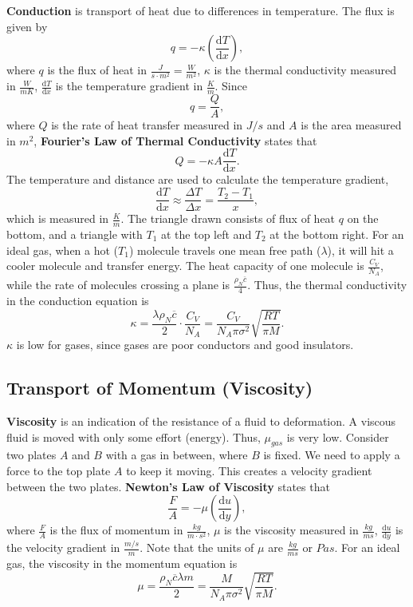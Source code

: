 \documentclass[11pt]{article}
\theoremstyle{plain} %
\theoremstyle{definition}
\theoremstyle{example}
\theoremstyle{remark}
\begin{document}
\textbf{Conduction} is transport of heat due to differences in temperature. The flux is given by $$q = -\kappa\left(\frac{\mathrm d T}{\mathrm d x}\right),$$
where $q$ is the flux of heat in $\frac{J}{s\cdot m^2} = \frac{W}{m^2}$, $\kappa$ is the thermal conductivity measured in $\frac{W}{mK}$, $\frac{\mathrm d T}{\mathrm d x}$ is the temperature gradient in $\frac{K}{m}$. Since $$q = \frac{Q}{A},$$ where $Q$ is the rate of heat transfer measured in $J/s$ and $A$ is the area measured in $m^2$, \textbf{Fourier's Law of Thermal Conductivity} states that 
$$Q = -\kappa A\frac{\mathrm d T}{\mathrm d x}.$$ The temperature and distance are used to calculate the temperature gradient,
$$\frac{\mathrm d T}{\mathrm d x} \approx \frac{\Delta T}{\Delta x} = \frac{T_2-T_1}{x},$$ which is measured in $\frac{K}{m}$. The triangle drawn consists of flux of heat $q$ on the bottom, and a triangle with $T_1$ at the top left and $T_2$ at the bottom right. For an ideal gas, when a hot ($T_1$) molecule travels one mean free path ($\lambda$), it will hit a cooler molecule and transfer energy. The heat capacity of one molecule is $\frac{C_V}{N_A}$, while the rate of molecules crossing a plane is $\frac{\rho_N\overline{c}}{4}$. Thus, the thermal conductivity in the conduction equation is 
$$\kappa = \frac{\lambda\rho_N\overline{c}}{2}\cdot \frac{C_V}{N_A} = \frac{C_V}{N_A\pi\sigma^2}\sqrt{\frac{RT}{\pi M}}.$$
$\kappa$ is low for gases, since gases are poor conductors and good insulators. 
	
	
\subsection{Transport of Momentum (Viscosity)}
	
\textbf{Viscosity} is an indication of the resistance of a fluid to deformation. A viscous fluid is moved with only some effort (energy). Thus, $\mu_{gas}$ is very low. Consider two plates $A$ and $B$ with a gas in between, where $B$ is fixed. We need to apply a force to the top plate $A$ to keep it moving. This creates a velocity gradient between the two plates. \textbf{Newton's Law of Viscosity} states that $$\frac{F}{A} = -\mu\left(\frac{\mathrm d u}{\mathrm d y}\right),$$
where $\frac{F}{A}$ is the flux of momentum in $\frac{kg}{m\cdot s^2}$, $\mu$ is the viscosity measured in $\frac{kg}{ms}$, $\frac{\mathrm d u}{\mathrm d y}$ is the velocity gradient in $\frac{m/s}{m}$. Note that the units of $\mu$ are $\frac{kg}{ms}$ or $Pas$. For an ideal gas, the viscosity in the momentum equation is 
$$\mu = \frac{\rho_N\overline{c}\lambda m}{2} = \frac{M}{N_A\pi\sigma^2}\sqrt{\frac{RT}{\pi M}}.$$
	
\end{document}
